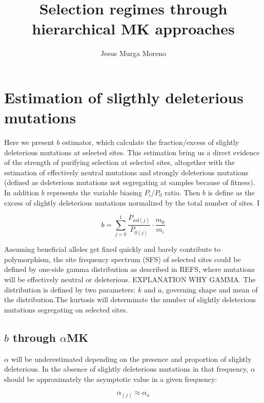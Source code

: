 \documentclass[11pt]{article}
\begin{document}
   

\title{Selection regimes through hierarchical MK approaches}    
\author{Jesus Murga Moreno}

\maketitle

\section{Estimation of sligthly deleterious mutations}    
	
	Here we present $b$ estimator, which calculate the fraction/excess of slightly deleterious mutations at selected sites. This estimation bring us a direct evidence of the strength of purifying selection at selected sites, altogether with the estimation of effectively neutral mutations and strongly deleterious mutations (defined as deleterious mutations not segregating at samples because of fitness). In addition $b$ represents the variable biasing $P_{i}/P_{0}$ ratio. Then $b$ is define as the excess of slightly deleterious mutations normalized by the total number of sites. I
	
\begin{equation}
	b = \sum_{j=0}^{1}\frac{P_{wd(j)}}{P_{0(j)}}\cdot\frac{m_{0}}{m_{i}}
\end{equation}

Assuming beneficial alleles get fixed quickly and barely contribute to polymorphism, the site frequency spectrum (SFS) of selected sites could be defined by one-side gamma distribution as described in REFS, where mutations will be effectively neutral or deleterious. EXPLANATION WHY GAMMA. The distribution is defined by two parameters: $k$ and $a$, governing shape and mean of the distribution.The kurtosis will determinate the number of slightly deleterious mutations segregating on selected sites. 

\subsection{$b$ through $\alpha$MK}
$\alpha$ will be underestimated depending on the presence and proportion of slightly deleterious. In the absence of slightly deleterious mutations in that frequency, $\alpha$ should be approximately the asymptotic value in a given frequency:

\begin{equation}
	\alpha_{(j)} \approx \alpha_{a}
\end{equation}
\end{document}
